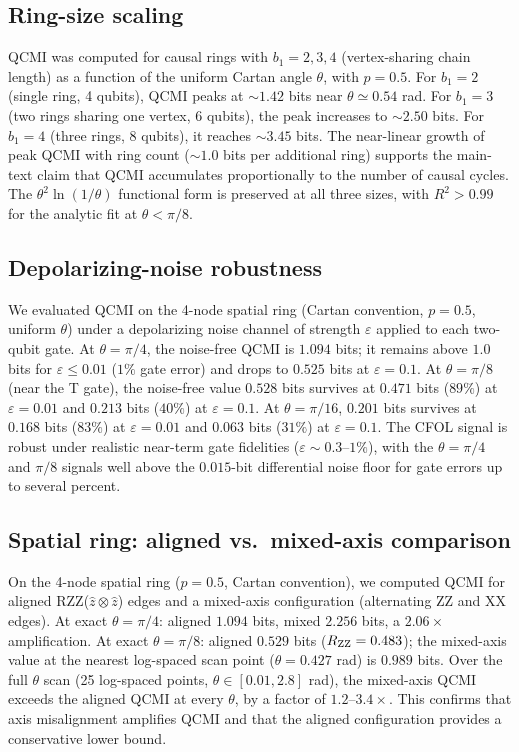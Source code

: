 \documentclass[aps,prl,superscriptaddress,nofootinbib]{revtex4-2}
\begin{document}
\subsection{Ring-size scaling}

QCMI was computed for causal rings with $b_1=2,3,4$ (vertex-sharing chain length) as a function of the uniform Cartan angle $\theta$, with $p=0.5$. For $b_1=2$ (single ring, 4 qubits), QCMI peaks at ${\sim}1.42$ bits near $\theta\simeq0.54$ rad. For $b_1=3$ (two rings sharing one vertex, 6 qubits), the peak increases to ${\sim}2.50$ bits. For $b_1=4$ (three rings, 8 qubits), it reaches ${\sim}3.45$ bits. The near-linear growth of peak QCMI with ring count (${\sim}1.0$ bits per additional ring) supports the main-text claim that QCMI accumulates proportionally to the number of causal cycles. The $\theta^2\ln(1/\theta)$ functional form is preserved at all three sizes, with $R^2>0.99$ for the analytic fit at $\theta<\pi/8$.

\subsection{Depolarizing-noise robustness}

We evaluated QCMI on the 4-node spatial ring (Cartan convention, $p=0.5$, uniform $\theta$) under a depolarizing noise channel of strength $\varepsilon$ applied to each two-qubit gate. At $\theta=\pi/4$, the noise-free QCMI is $1.094$ bits; it remains above $1.0$ bits for $\varepsilon\leq0.01$ ($1\%$ gate error) and drops to $0.525$ bits at $\varepsilon=0.1$. At $\theta=\pi/8$ (near the T gate), the noise-free value $0.528$ bits survives at $0.471$ bits ($89\%$) at $\varepsilon=0.01$ and $0.213$ bits ($40\%$) at $\varepsilon=0.1$. At $\theta=\pi/16$, $0.201$ bits survives at $0.168$ bits ($83\%$) at $\varepsilon=0.01$ and $0.063$ bits ($31\%$) at $\varepsilon=0.1$. The CFOL signal is robust under realistic near-term gate fidelities ($\varepsilon\sim0.3$--$1\%$), with the $\theta=\pi/4$ and $\pi/8$ signals well above the $0.015$-bit differential noise floor for gate errors up to several percent.

\subsection{Spatial ring: aligned vs.\ mixed-axis comparison}

On the 4-node spatial ring ($p=0.5$, Cartan convention), we computed QCMI for aligned RZZ($\hat{z}\otimes\hat{z}$) edges and a mixed-axis configuration (alternating ZZ and XX edges). At exact $\theta=\pi/4$: aligned $1.094$ bits, mixed $2.256$ bits, a $2.06\times$ amplification. At exact $\theta=\pi/8$: aligned $0.529$ bits ($R_{\rm ZZ}=0.483$); the mixed-axis value at the nearest log-spaced scan point ($\theta=0.427$ rad) is $0.989$ bits. Over the full $\theta$ scan (25 log-spaced points, $\theta\in[0.01,2.8]$ rad), the mixed-axis QCMI exceeds the aligned QCMI at every $\theta$, by a factor of $1.2$--$3.4\times$. This confirms that axis misalignment amplifies QCMI and that the aligned configuration provides a conservative lower bound.
\end{document}
